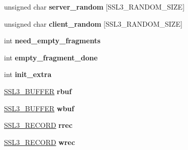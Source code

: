 \begin{DoxyCompactItemize}
\item 
\hypertarget{structssl3__state__st_ae0e0d20a2153469e1f0ee40b5852392b}{}unsigned char {\bfseries server\+\_\+random} \mbox{[}S\+S\+L3\+\_\+\+R\+A\+N\+D\+O\+M\+\_\+\+S\+I\+Z\+E\mbox{]}\label{structssl3__state__st_ae0e0d20a2153469e1f0ee40b5852392b}

\item 
\hypertarget{structssl3__state__st_a08ccdbf1359a0d714bb7c1934dc3e7d4}{}unsigned char {\bfseries client\+\_\+random} \mbox{[}S\+S\+L3\+\_\+\+R\+A\+N\+D\+O\+M\+\_\+\+S\+I\+Z\+E\mbox{]}\label{structssl3__state__st_a08ccdbf1359a0d714bb7c1934dc3e7d4}

\item 
\hypertarget{structssl3__state__st_aa7dc2c2f9d03ff717c3aef1051784357}{}int {\bfseries need\+\_\+empty\+\_\+fragments}\label{structssl3__state__st_aa7dc2c2f9d03ff717c3aef1051784357}

\item 
\hypertarget{structssl3__state__st_a97e5546af9e51f39f4a6c9f7b73ba1b1}{}int {\bfseries empty\+\_\+fragment\+\_\+done}\label{structssl3__state__st_a97e5546af9e51f39f4a6c9f7b73ba1b1}

\item 
\hypertarget{structssl3__state__st_ac744a39f9703118ad914799059630a70}{}int {\bfseries init\+\_\+extra}\label{structssl3__state__st_ac744a39f9703118ad914799059630a70}

\item 
\hypertarget{structssl3__state__st_afe5098e88b32cad3b79243f2b53f6040}{}\hyperlink{structssl3__buffer__st}{S\+S\+L3\+\_\+\+B\+U\+F\+F\+E\+R} {\bfseries rbuf}\label{structssl3__state__st_afe5098e88b32cad3b79243f2b53f6040}

\item 
\hypertarget{structssl3__state__st_a96b970880608f297b54db97424330be3}{}\hyperlink{structssl3__buffer__st}{S\+S\+L3\+\_\+\+B\+U\+F\+F\+E\+R} {\bfseries wbuf}\label{structssl3__state__st_a96b970880608f297b54db97424330be3}

\item 
\hypertarget{structssl3__state__st_affde905dbcf7ece7aab929f37ffe043a}{}\hyperlink{structssl3__record__st}{S\+S\+L3\+\_\+\+R\+E\+C\+O\+R\+D} {\bfseries rrec}\label{structssl3__state__st_affde905dbcf7ece7aab929f37ffe043a}

\item 
\hypertarget{structssl3__state__st_ab3e2700e58172be629db1f2af7ef510a}{}\hyperlink{structssl3__record__st}{S\+S\+L3\+\_\+\+R\+E\+C\+O\+R\+D} {\bfseries wrec}\label{structssl3__state__st_ab3e2700e58172be629db1f2af7ef510a}


\end{DoxyCompactItemize}
